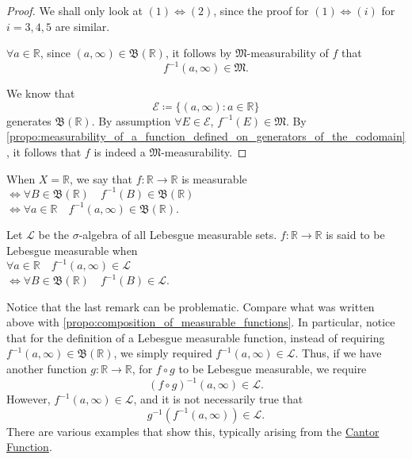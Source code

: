 \documentclass[notoc,notitlepage]{tufte-book}
\begin{document}
\begin{proof}
  We shall only look at $(1) \iff (2)$, since
  the proof for $(1) \iff (i)$ for $i = 3,4,5$ are similar.

  \noindent
  $\forall a \in \mathbb{R}$, since $(a, \infty) \in \mathfrak{B}(\mathbb{R})$,
  it follows by $\mathfrak{M}$-measurability of $f$ that
  \begin{equation*}
    f^{-1}(a, \infty) \in \mathfrak{M}.
  \end{equation*}

  \noindent
  We know that
  \begin{equation*}
    \mathcal{E} \coloneqq \{ (a, \infty) : a \in \mathbb{R} \}
  \end{equation*}
  generates $\mathfrak{B}(\mathbb{R})$.
  By assumption $\forall E \in \mathcal{E}$, $f^{-1}(E) \in \mathfrak{M}$.
  By
  \cref{propo:measurability_of_a_function_defined_on_generators_of_the_codomain},
  it follows that $f$ is indeed a $\mathfrak{M}$-measurability.
\end{proof}

\begin{remark}
  When $X = \mathbb{R}$,
  we say that $f : \mathbb{R} \to \mathbb{R}$ is measurable \\
  $\iff \forall B \in \mathfrak{B}(\mathbb{R})\quad
    f^{-1}(B) \in \mathfrak{B}(\mathbb{R})$ \\
  $\iff \forall a \in \mathbb{R}\quad f^{-1}(a, \infty) \in \mathfrak{B}(\mathbb{R})$.

  Let $\mathcal{L}$ be the $\sigma$-algebra of all Lebesgue measurable sets.
  $f : \mathbb{R} \to \mathbb{R}$ is said to be Lebesgue measurable when \\
  $\forall a \in \mathbb{R}\quad f^{-1}(a, \infty) \in \mathcal{L}$ \\
  $\iff \forall B \in \mathfrak{B}(\mathbb{R})\quad f^{-1}(B) \in \mathcal{L}$.
\end{remark}

\begin{warning}
  Notice that the last remark can be problematic.
  Compare what was written above with
  \cref{propo:composition_of_measurable_functions}.
  In particular,
  notice that for the definition of a Lebesgue measurable function,
  instead of requiring $f^{-1}(a, \infty) \in \mathfrak{B}(\mathbb{R})$,
  we simply required $f^{-1}(a, \infty) \in \mathcal{L}$.
  Thus, if we have another function $g : \mathbb{R} \to \mathbb{R}$,
  for $f \circ g$ to be Lebesgue measurable, we require
  \begin{equation*}
    (f \circ g)^{-1}(a, \infty) \in \mathcal{L}.
  \end{equation*}
  However, $f^{-1}(a, \infty) \in \mathcal{L}$,
  and it is not necessarily true that
  \begin{equation*}
    g^{-1}(f^{-1}(a, \infty)) \in \mathcal{L}.
  \end{equation*}
  There are various examples that show this,
  typically arising from the \hyperref[para:cantor_function]{Cantor Function}.
\end{warning}
\end{document}
